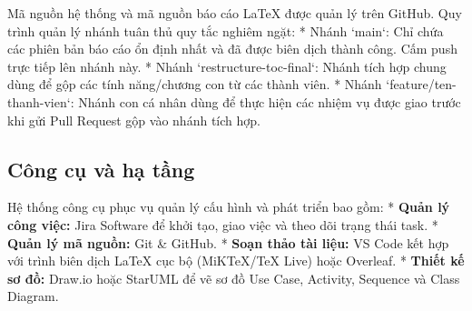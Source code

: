 Mã nguồn hệ thống và mã nguồn báo cáo LaTeX được quản lý trên GitHub. Quy trình quản lý nhánh tuân thủ quy tắc nghiêm ngặt:
* Nhánh `main`: Chỉ chứa các phiên bản báo cáo ổn định nhất và đã được biên dịch thành công. Cấm push trực tiếp lên nhánh này.
* Nhánh `restructure-toc-final`: Nhánh tích hợp chung dùng để gộp các tính năng/chương con từ các thành viên.
* Nhánh `feature/ten-thanh-vien`: Nhánh con cá nhân dùng để thực hiện các nhiệm vụ được giao trước khi gửi Pull Request gộp vào nhánh tích hợp.

\subsection{Công cụ và hạ tầng}
\label{subsec:spmp_tools_infrastructure}

Hệ thống công cụ phục vụ quản lý cấu hình và phát triển bao gồm:
* \textbf{Quản lý công việc:} Jira Software để khởi tạo, giao việc và theo dõi trạng thái task.
* \textbf{Quản lý mã nguồn:} Git \& GitHub.
* \textbf{Soạn thảo tài liệu:} VS Code kết hợp với trình biên dịch LaTeX cục bộ (MiKTeX/TeX Live) hoặc Overleaf.
* \textbf{Thiết kế sơ đồ:} Draw.io hoặc StarUML để vẽ sơ đồ Use Case, Activity, Sequence và Class Diagram.
